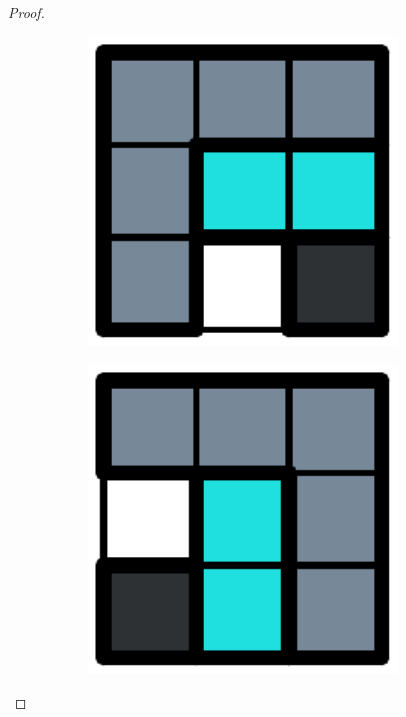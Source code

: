 \begin{proof}
\begin{figure}[h]
  \centering
  \begin{subfigure}[b]{0.1\textwidth}
    \centering
    \includegraphics[width=0.9\textwidth]{pictures/dominoes/turns/turn_1.pdf}
    \caption{}
    \label{dom:turn1}
  \end{subfigure}
  \begin{subfigure}[b]{0.1\textwidth}
    \centering
    \includegraphics[width=0.9\textwidth]{pictures/dominoes/turns/turn_2.pdf}

\end{subfigure}
\end{figure}
\end{proof}

